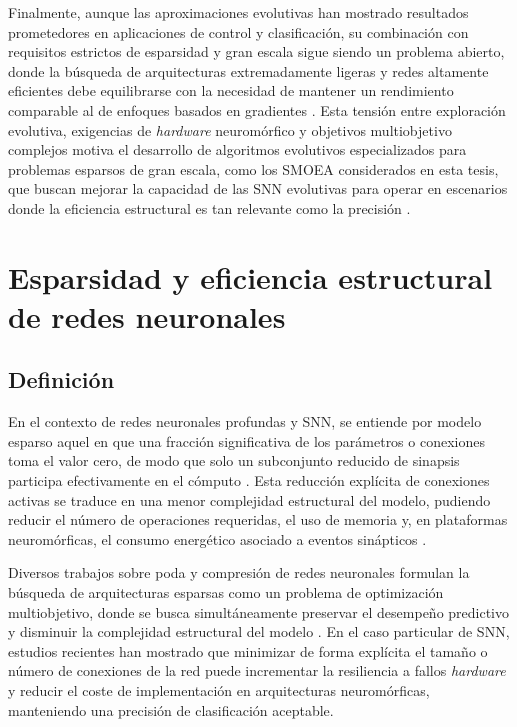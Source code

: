 Finalmente, aunque las aproximaciones evolutivas han mostrado resultados prometedores en aplicaciones de control y clasificación, su combinación con requisitos estrictos de esparsidad y gran escala sigue siendo un problema abierto, donde la búsqueda de arquitecturas extremadamente ligeras y redes altamente eficientes debe equilibrarse con la necesidad de mantener un rendimiento comparable al de enfoques basados en gradientes \cite{dimovska2020multiobjectiveoptimizationsizeresilience, Schuman2020evooptineuro}. Esta tensión entre exploración evolutiva, exigencias de \textit{hardware} neuromórfico y objetivos multiobjetivo complejos motiva el desarrollo de algoritmos evolutivos especializados para problemas esparsos de gran escala, como los SMOEA considerados en esta tesis, que buscan mejorar la capacidad de las SNN evolutivas para operar en escenarios donde la eficiencia estructural es tan relevante como la precisión \cite{Shen2024EvolutionarySNN, Schuman2022Opportunities}.


\section{Esparsidad y eficiencia estructural de redes neuronales}

\subsection{Definición}
En el contexto de redes neuronales profundas y SNN, se entiende por modelo esparso aquel en que una fracción significativa de los parámetros o conexiones toma el valor cero, de modo que solo un subconjunto reducido de sinapsis participa efectivamente en el cómputo \cite{REINERS2022sparse, Huang2021sparse-opti-multi}. Esta reducción explícita de conexiones activas se traduce en una menor complejidad estructural del modelo, pudiendo reducir el número de operaciones requeridas, el uso de memoria y, en plataformas neuromórficas, el consumo energético asociado a eventos sinápticos \cite{LIAN2024-multi-cnn-ea, Schuman2022Opportunities, REINERS2022sparse}.

Diversos trabajos sobre poda y compresión de redes neuronales formulan la búsqueda de arquitecturas esparsas como un problema de optimización multiobjetivo, donde se busca simultáneamente preservar el desempeño predictivo y disminuir la complejidad estructural del modelo \cite{Huang2021sparse-opti-multi, REINERS2022sparse}. En el caso particular de SNN, estudios recientes \cite{dimovska2020multiobjectiveoptimizationsizeresilience, Schuman2022Opportunities} han mostrado que minimizar de forma explícita el tamaño o número de conexiones de la red puede incrementar la resiliencia a fallos \textit{hardware} y reducir el coste de implementación en arquitecturas neuromórficas, manteniendo una precisión de clasificación aceptable.

